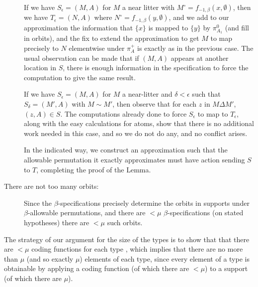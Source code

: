\documentclass[112pt]{article}
\begin{document}
\begin{description}
If we have $S_\epsilon= (M,A)$ for $M$ a near litter with $M^\circ = f_{-1,\beta}(x,\emptyset)$, then we have $T_\epsilon=(N,A)$
where  $N^\circ = f_{-1,\beta}(y,\emptyset)$, and we add to our approximation the information that $\{x\}$ is mapped to 
$\{y\}$ by $\pi^0_{A_1}$ (and fill in orbits), and the fix to extend the approximation to get $M$ to map precisely to $N$ elementwise under $\pi^+_A$ is exactly as in the previous case.  The usual observation can be made that if $(M,A)$ appears at another location in $S$, there is enough information in the specification to force the computation to give the same result.

If we have $S_\epsilon=(M,A)$ for $M$ a near-litter and $\delta<\epsilon$ such that
$S_\delta = (M',A)$ with $M \sim M'$, then observe that for each $z$ in $M \Delta M'$,
$(z,A) \in S$.  The computations already done to force $S_\epsilon$ to map to $T_\epsilon$, along with the easy calculations for atoms, show that there is no additional work needed in this case, and so we do not do any, and no conflict arises.

In the indicated way, we construct an approximation such that the allowable permutation it exactly approximates must have action sending $S$ to $T$, completing the proof of the Lemma.

\item[There are not too many orbits:]  Since the $\beta$-specifications precisely determine the orbits in supports under $\beta$-allowable permutations, and there are $<\mu$ $\beta$-specifications
(on stated hypotheses) there are $<\mu$ such orbits.
\end{description}





The strategy of our argument for the size of the types is to show that that there are $<\mu$ coding functions for each type , which implies that there are no more than $\mu$ (and so exactly $\mu$) elements of each type, since every element of a type is obtainable by applying a coding function (of which there are $<\mu$) to a support (of which there are $\mu$).
\end{document}
